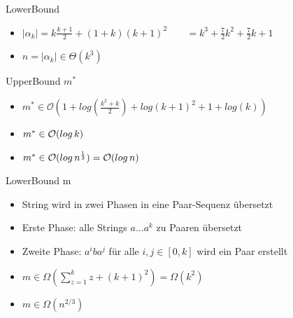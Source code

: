 \begin{frame}{\FrameName}
\begin{block}{LowerBound}
	\begin{center}
	\end{center}
	\begin{itemize}[<+->]
		\item $|\alpha_k | = k \frac{k+1}{2} + (1+k)(k+1)^2$ \linebreak
			$\phantom{|\alpha_k |} = k^3 + \frac{7}{2}k^2 + \frac{7}{2}k + 1$
		\item $ n = |\alpha_k | \in \Theta(k^3)$
	\end{itemize}
\end{block}
\end{frame}

\begin{frame}{\FrameName}
\begin{block}{UpperBound $m^*$}
	\begin{center}
	\end{center}
	\begin{itemize}[<+->]
		\item $m^* \in \mathcal{O}(1+ log(\frac{k^2+k}{2}) + log(k+1)^2 + 1+ log(k))$
		\item $m^* \in \mathcal{O}(log \thinspace k)$
		\item $m^* \in \mathcal{O}(log \thinspace n^\frac{1}{3}) = \mathcal{O}(log \thinspace n)$
	\end{itemize}
\end{block}
\end{frame}

\begin{frame}{\FrameName}
\begin{block}{LowerBound m}
	\begin{center}
	\end{center}
	\begin{itemize}[<+->]
		\item String wird in zwei Phasen in eine Paar-Sequenz übersetzt
		\item Erste Phase: alle Strings $a...a^k$ zu Paaren übersetzt
		\item Zweite Phase: $a^iba^j$ für alle $i,j \in [0,k]$ wird ein Paar erstellt
		\item $m \in \Omega(\sum_{z=1}^k z + (k+1)^2) = \Omega(k^2)$
		\item $m \in \Omega(n^{2/3})$
	\end{itemize}
\end{block}
\end{frame}

